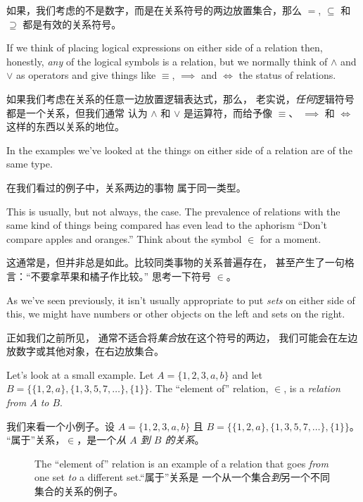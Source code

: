 如果，我们考虑的不是数字，而是在关系符号的两边放置集合，那么
$=$, $\subseteq$ 和 $\supseteq$ 都是有效的关系符号。

If we think 
of placing logical expressions on either side of a relation then, 
honestly, \emph{any} of the logical symbols is a relation, but we normally
think of $\land$ and $\lor$ as operators and give things like $\equiv$, 
$\implies$ and $\iff$ the status of relations.

如果我们考虑在关系的任意一边放置逻辑表达式，那么，
老实说，\emph{任何}逻辑符号都是一个关系，但我们通常
认为 $\land$ 和 $\lor$ 是运算符，而给予像 $\equiv$、
$\implies$ 和 $\iff$ 这样的东西以关系的地位。

In the examples we've looked at the things on either side of a relation
are of the same type.

在我们看过的例子中，关系两边的事物
属于同一类型。

This is usually, but not always, the case.  The 
prevalence of relations with the same kind of things being compared has
even lead to the aphorism ``Don't compare apples and oranges.''  Think 
about the symbol $\in$ for a moment.

这通常是，但并非总是如此。比较同类事物的关系普遍存在，
甚至产生了一句格言：“不要拿苹果和橘子作比较。” 思考一下符号 $\in$。

As we've seen previously, it
isn't usually appropriate to put \emph{sets} on either side of this,
we might have numbers or other objects on the left and sets on the right.

正如我们之前所见，
通常不适合将\emph{集合}放在这个符号的两边，
我们可能会在左边放数字或其他对象，在右边放集合。

Let's look at a small example.  Let $A = \{1,2,3,a,b\}$ and let 
$B=\{ \{1,2,a\}, \{1,3,5,7,\ldots\}, \{1\} \}$.
The ``element of'' 
relation, $\in$, is a \emph{relation from $A$ to $B$}.

我们来看一个小例子。设 $A = \{1,2,3,a,b\}$ 且 
$B=\{ \{1,2,a\}, \{1,3,5,7,\ldots\}, \{1\} \}$。
“属于”关系，$\in$，是一个\emph{从 $A$ 到 $B$ 的关系}。

\begin{figure}[!hbtp]

\caption[An example of a relation.一个关系的例子]{The ``element of'' relation %
is an example of a relation that goes \emph{from} one set \emph{to} a %
different set.“属于”关系是
一个从一个集合\emph{到}另一个不同集合的关系的例子。}
\label{fig:rel1} 
\end{figure}

